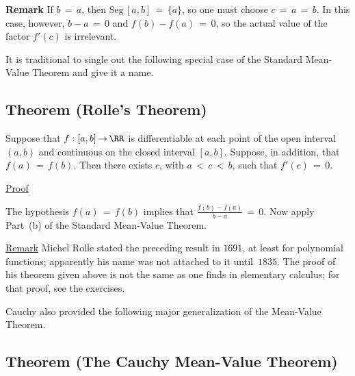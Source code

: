 \V

        {\bf Remark} If $b \,=\, a$, then $\mbox{Seg}\,[a,b] \,=\, \{a\}$, so one must choose $c \,=\, a \,=\, b$.
    In this case, however, $b-a \,=\, 0$ and $f(b)-f(a) \,=\, 0$, so the actual value of the factor $f'(c)$ is irrelevant.

\VV

        It is traditional to single out the following special case of the Standard Mean-Value Theorem and give it a name.

\V

             \subsection{\small{\bf Theorem} (Rolle's Theorem)}
            \label{ThmE50.30}

\V

        Suppose that $f:[a,b] \,{\rightarrow}\, {\RR}$ is differentiable at each point of the open interval $(a,b)$ and continuous on the closed interval $[a,b]$.
     Suppose, in addition, that $f(a) \,=\, f(b)$. Then there exists $c$, with $a\,<\,c\,<\,b$, such that $f'(c) \,=\, 0$.

\V

        \underline{Proof}

\V

        The hypothesis $f(a) \,=\, f(b)$ implies that ${\displaystyle \frac{f(b)-f(a)}{b-a}} \,=\, 0$.
    Now apply Part~(b) of the Standard Mean-Value Theorem.

\V

        \underline{Remark} Michel Rolle stated the preceding result in $1691$, at least for polynomial functions;
    apparently his name was not attached to it until~$1835$. The proof of his theorem given above is not the same as one finds in elementary calculus;
    for that proof, see the exercises.


\VV

        Cauchy also provided the following major generalization of the Mean-Value Theorem.

\V

             \subsection{\small{\bf Theorem} (The Cauchy Mean-Value Theorem)}
            \label{ThmE50.40}

